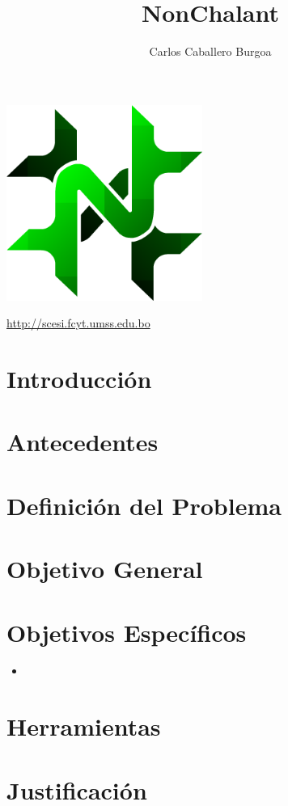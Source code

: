 \documentclass[letter,12pt]{article}
\title{\bf NonChalant}
\author{Carlos Caballero Burgoa}
\begin{document}
\maketitle
\begin{center}\includegraphics[width=0.48\textwidth]{nonchalant.png}\end{center}
\begin{center}\url {http://scesi.fcyt.umss.edu.bo}\end{center}
\pagebreak

\tableofcontents
\pagebreak

\section{Introducción}

\section{Antecedentes}

\section{Definición del Problema}


\section{Objetivo General}


\section{Objetivos Específicos}
\begin{itemize}
\item 
\end{itemize}

\section{Herramientas}

\section{Justificación}

\begin{thebibliography}{99}
\end{thebibliography}
\end{document}
